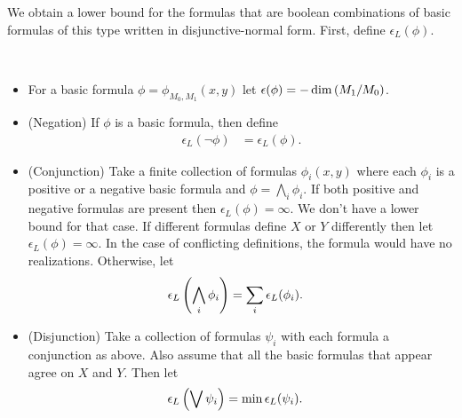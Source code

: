 We obtain a lower bound for the formulas that are boolean combinations of basic formulas of this type written in disjunctive-normal form.
First, define $\epsilon_L(\phi)$.

\begin{Definition} \ 
  \begin{itemize}
  \item For a basic formula $\phi = \phi_{M_0, M_1}(x, y)$ let $\epsilon(\phi) = -\dim \left(M_1/M_0\right)$.
  \item (Negation)
    If $\phi$ is a basic formula, then define
    \begin{align*}
      \epsilon_L(\neg \phi) &= \epsilon_L(\phi).
    \end{align*}
  \item (Conjunction)
    Take a finite collection of formulas $\phi_i(x, y)$ where each $\phi_i$ is a positive or a negative basic formula
    and $\phi = \bigwedge_i\phi_i$.
    If both positive and negative formulas are present then $\epsilon_L(\phi) = \infty$.
    We don't have a lower bound for that case.
    If different formulas define $X$ or $Y$ differently then let $\epsilon_L(\phi) = \infty$.
    In the case of conflicting definitions, the formula would have no realizations.
    Otherwise, let
    \begin{align*}
      \epsilon_L\left(\bigwedge_i \phi_i\right) &= \sum_i \epsilon_L(\phi_i).
    \end{align*}
  \item  (Disjunction)
    Take a collection of formulas $\psi_i$ with each formula a conjunction as above.
    Also assume that all the basic formulas that appear agree on $X$ and $Y$.
    Then let
    \begin{align*}
      \epsilon_L\left(\bigvee \psi_i\right) &= \min \epsilon_L(\psi_i).
    \end{align*}
  \end{itemize}
\end{Definition}

